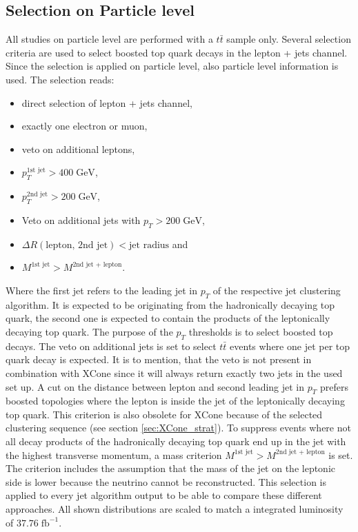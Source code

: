 \subsection{Selection on Particle level}
\label{sec:GenSel}
	All studies on particle level are performed with a $t\bar{t}$ sample only. Several selection criteria are used to select boosted top quark decays in the lepton + jets channel. Since the selection is applied on particle level, also particle level information is used. The selection reads:
	\begin{itemize}
	\item direct selection of lepton + jets channel,
	\item exactly one electron or muon,
	\item veto on additional leptons,
	\item $p_T^{\text{1st jet}} > 400\;\text{GeV}$,
	\item $p_T^{\text{2nd jet}} > 200\;\text{GeV}$,
	\item Veto on additional jets with $p_T > 200\;\text{GeV}$,
	\item $\Delta R (\text{lepton, 2nd jet}) < \text{jet radius}$ and
	\item $M^{\text{1st jet}} > M^{\text{2nd jet + lepton}}$.
	\end{itemize}
	Where the first jet refers to the leading jet in $p_T$ of the respective jet clustering algorithm. It is expected to be originating from the hadronically decaying top quark, the second one is expected to contain the products of the leptonically decaying top quark. The purpose of the $p_T$ thresholds is to select boosted top decays. The veto on additional jets is set to select $t\bar{t}$ events where one jet per top quark decay is expected. It is to mention, that the veto is not present in combination with XCone since it will always return exactly two jets in the used set up. A cut on the distance between lepton and second leading jet in $p_T$ prefers boosted topologies where the lepton is inside the jet of the leptonically decaying top quark. This criterion is also obsolete for XCone because of the selected clustering sequence (see section \ref{sec:XCone_strat}). To suppress events where not all decay products of the hadronically decaying top quark end up in the jet with the highest transverse momentum, a mass criterion $M^{\text{1st jet}} > M^{\text{2nd jet + lepton}}$ is set. The criterion includes the assumption that the mass of the jet on the leptonic side is lower because the neutrino cannot be reconstructed. This selection is applied to every jet algorithm output to be able to compare these different approaches. All shown distributions are scaled to match a integrated luminosity of $37.76\;\text{fb}^{-1}$.


